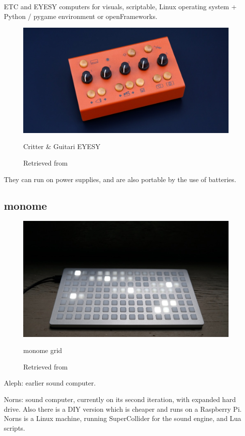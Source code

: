ETC and EYESY computers for visuals, scriptable, Linux operating system + Python / pygame environment or openFrameworks.

\begin{figure}[ht]
  \centering
  \includegraphics[width=0.75\linewidth,height=0.25\textheight,keepaspectratio]{images/critter-and-guitari-eyesy.jpg}
  \caption{Critter \& Guitari EYESY}
  \caption*{Retrieved from \cite{website-critter-and-guitari-current}}
  \label{fig:critter-and-guitari-eyesy}
\end{figure}

They can run on power supplies, and are also portable by the use of batteries.

\subsection{monome}

\begin{figure}[ht]
  \centering
  \includegraphics[width=0.75\linewidth,height=0.25\textheight,keepaspectratio]{images/monome-grid.jpg}
  \caption{monome grid}
  \caption*{Retrieved from \cite{website-monome-current}}
  \label{fig:monome-grid}
\end{figure}

Aleph: earlier sound computer.

Norns: sound computer, currently on its second iteration, with expanded hard drive. Also there is a DIY version which is cheaper and runs on a Raspberry Pi.
Norns is a Linux machine, running SuperCollider for the sound engine, and Lua scripts.

